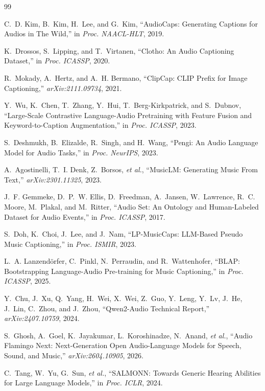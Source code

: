 \documentclass[conference]{IEEEtran}
\begin{document}
\begin{thebibliography}{99}

C.~D. Kim, B.~Kim, H.~Lee, and G.~Kim,
``AudioCaps: Generating Captions for Audios in The Wild,'' in \emph{Proc. NAACL-HLT}, 2019.

K.~Drossos, S.~Lipping, and T.~Virtanen,
``Clotho: An Audio Captioning Dataset,'' in \emph{Proc. ICASSP}, 2020.

R.~Mokady, A.~Hertz, and A.~H. Bermano,
``ClipCap: CLIP Prefix for Image Captioning,'' \emph{arXiv:2111.09734}, 2021.

Y.~Wu, K.~Chen, T.~Zhang, Y.~Hui, T.~Berg-Kirkpatrick, and S.~Dubnov,
``Large-Scale Contrastive Language-Audio Pretraining with Feature Fusion and
Keyword-to-Caption Augmentation,'' in \emph{Proc. ICASSP}, 2023.

S.~Deshmukh, B.~Elizalde, R.~Singh, and H.~Wang,
``Pengi: An Audio Language Model for Audio Tasks,'' in \emph{Proc. NeurIPS}, 2023.

A.~Agostinelli, T.~I. Denk, Z.~Borsos, \emph{et al.},
``MusicLM: Generating Music From Text,'' \emph{arXiv:2301.11325}, 2023.

J.~F. Gemmeke, D.~P.~W. Ellis, D.~Freedman, A.~Jansen, W.~Lawrence, R.~C. Moore,
M.~Plakal, and M.~Ritter,
``Audio Set: An Ontology and Human-Labeled Dataset for Audio Events,'' in \emph{Proc. ICASSP},
2017.

S.~Doh, K.~Choi, J.~Lee, and J.~Nam,
``LP-MusicCaps: LLM-Based Pseudo Music Captioning,'' in \emph{Proc. ISMIR}, 2023.

L.~A. Lanzendörfer, C.~Pinkl, N.~Perraudin, and R.~Wattenhofer,
``BLAP: Bootstrapping Language-Audio Pre-training for Music Captioning,'' in \emph{Proc. ICASSP},
2025.

Y.~Chu, J.~Xu, Q.~Yang, H.~Wei, X.~Wei, Z.~Guo, Y.~Leng, Y.~Lv, J.~He, J.~Lin, C.~Zhou, and
J.~Zhou,
``Qwen2-Audio Technical Report,'' \emph{arXiv:2407.10759}, 2024.

S.~Ghosh, A.~Goel, K.~Jayakumar, L.~Koroshinadze, N.~Anand, \emph{et al.},
``Audio Flamingo Next: Next-Generation Open Audio-Language Models for Speech, Sound, and Music,''
\emph{arXiv:2604.10905}, 2026.

C.~Tang, W.~Yu, G.~Sun, \emph{et al.},
``SALMONN: Towards Generic Hearing Abilities for Large Language Models,'' in \emph{Proc. ICLR},
2024.


\end{thebibliography}
\end{document}

